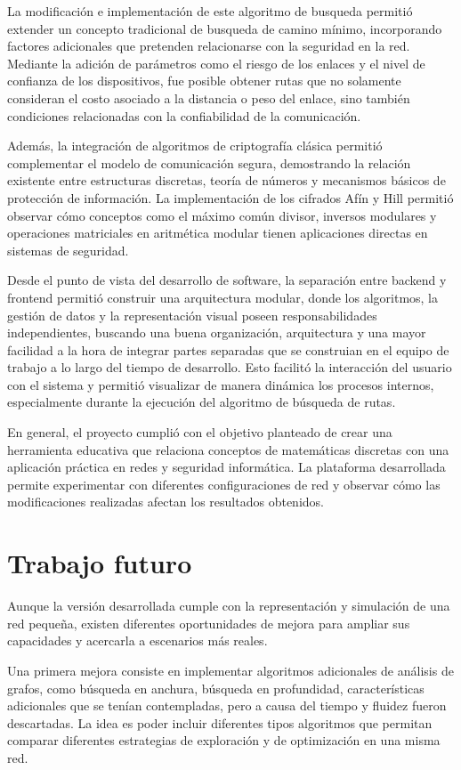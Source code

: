 \documentclass[conference]{IEEEtran}
\begin{document}
La modificación e implementación de este algoritmo de busqueda permitió extender un concepto tradicional de busqueda de camino mínimo, incorporando factores adicionales que pretenden relacionarse con la seguridad en la red. Mediante la adición de parámetros como el riesgo de los enlaces y el nivel de confianza de los dispositivos, fue posible obtener rutas que no solamente consideran el costo asociado a la distancia o peso del enlace, sino también condiciones relacionadas con la confiabilidad de la comunicación.

Además, la integración de algoritmos de criptografía clásica permitió complementar el modelo de comunicación segura, demostrando la relación existente entre estructuras discretas, teoría de números y mecanismos básicos de protección de información. La implementación de los cifrados Afín y Hill permitió observar cómo conceptos como el máximo común divisor, inversos modulares y operaciones matriciales en aritmética modular tienen aplicaciones directas en sistemas de seguridad.

Desde el punto de vista del desarrollo de software, la separación entre backend y frontend permitió construir una arquitectura modular, donde los algoritmos, la gestión de datos y la representación visual poseen responsabilidades independientes, buscando una buena organización, arquitectura y una mayor facilidad a la hora de integrar partes separadas que se construian en el equipo de trabajo a lo largo del tiempo de desarrollo. Esto facilitó la interacción del usuario con el sistema y permitió visualizar de manera dinámica los procesos internos, especialmente durante la ejecución del algoritmo de búsqueda de rutas.

En general, el proyecto cumplió con el objetivo planteado de crear una herramienta educativa que relaciona conceptos de matemáticas discretas con una aplicación práctica en redes y seguridad informática. La plataforma desarrollada permite experimentar con diferentes configuraciones de red y observar cómo las modificaciones realizadas afectan los resultados obtenidos.

\section{Trabajo futuro}
Aunque la versión desarrollada cumple con la representación y simulación de una red pequeña, existen diferentes oportunidades de mejora para ampliar sus capacidades y acercarla a escenarios más reales.

Una primera mejora consiste en implementar algoritmos adicionales de análisis de grafos, como búsqueda en anchura, búsqueda en profundidad, características adicionales que se tenían contempladas, pero a causa del tiempo y fluidez fueron descartadas. La idea es poder incluir diferentes tipos algoritmos que permitan comparar diferentes estrategias de exploración y de optimización en una misma red.
\end{document}
